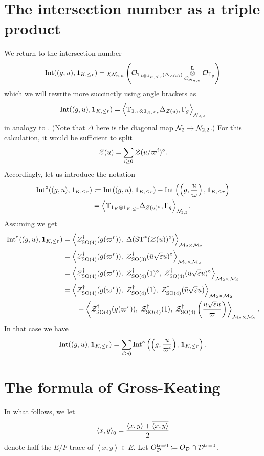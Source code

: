 \section{The intersection number as a triple product}
We return to the intersection number
\[ \operatorname{Int}((g,u), \mathbf{1}_{K, \le r}) = \chi_{\mathcal N_{n,n}} \left(
      \mathcal{O}_{\mathbb T_{\mathbf{1} \otimes \mathbf{1}_{K, \le r}}(\Delta_{\mathcal Z(u)})}
      \mathop{\otimes}^{\mathbf{L}}_{\mathcal{O}_{\mathcal N_{n,n}}} \mathcal{O}_{\Gamma_g} \right) \]
which we will rewrite more succinctly using angle brackets as
\[ \operatorname{Int}((g,u), \mathbf{1}_{K, \le r}) = \Big\langle
  \mathbb{T}_{\mathbf{1}_K \otimes \mathbf{1}_{K, \le r}}
  \Delta_{\mathcal Z(u)}, \Gamma_g \Big\rangle_{\mathcal N_{2,2}} \]
in analogy to \cite[\S6.1]{ref:AFLspherical}.
(Note that $\Delta$ here is the diagonal map $\mathcal N_2 \to \mathcal N_{2,2}$.)
For this calculation, it would be sufficient to split
\[ \mathcal Z(u) = \sum_{i \ge 0} \mathcal Z(u/\varpi^i)^\circ. \]
Accordingly, let us introduce the notation
\begin{align*}
  \operatorname{Int}^\circ((g,u), \mathbf{1}_{K, \le r})
  &\coloneqq \operatorname{Int}((g,u), \mathbf{1}_{K, \le r}) - \operatorname{Int}\left( \left( g, \frac{u}{\varpi} \right), \mathbf{1}_{K, \le r} \right) \\
  &= \Big\langle \mathbb{T}_{\mathbf{1}_K \otimes \mathbf{1}_{K, \le r}}
    \Delta_{\mathcal Z(u)^\circ}, \Gamma_g \Big\rangle_{\mathcal N_{2,2}}.
\end{align*}
Assuming  we get
\begin{align*}
  \operatorname{Int}^\circ((g,u), \mathbf{1}_{K, \le r})
  &= \left< \mathcal Z^{\dagger}_{\operatorname{SO}(4)}(g(\varpi^r)), \; \Delta(\operatorname{ST}^\ast(\mathcal Z(u))^\circ) \right>_{\mathcal M_2 \times \mathcal M_2} \\
  &= \left< \mathcal Z^{\dagger}_{\operatorname{SO}(4)}(g(\varpi^r)), \; \mathcal Z^{\dagger}_{\operatorname{SO}(3)}(\bar u \sqrt{\varepsilon} u)^\circ \right>_{\mathcal M_2 \times \mathcal M_2} \\
  &= \left< \mathcal Z^{\dagger}_{\operatorname{SO}(4)}(g(\varpi^r)), \; \mathcal Z^{\dagger}_{\operatorname{SO}(4)}(1)^\circ, \; \mathcal Z^{\dagger}_{\operatorname{SO}(4)}(\bar u \sqrt{\varepsilon} u)^\circ \right>_{\mathcal M_2 \times \mathcal M_2} \\
  &= \left< \mathcal Z^{\dagger}_{\operatorname{SO}(4)}(g(\varpi^r)), \; \mathcal Z^{\dagger}_{\operatorname{SO}(4)}(1), \; \mathcal Z^{\dagger}_{\operatorname{SO}(4)}(\bar u \sqrt{\varepsilon} u) \right>_{\mathcal M_2 \times \mathcal M_2} \\
  &\qquad- \left< \mathcal Z^{\dagger}_{\operatorname{SO}(4)}(g(\varpi^r)), \; \mathcal Z^{\dagger}_{\operatorname{SO}(4)}(1), \; \mathcal Z^{\dagger}_{\operatorname{SO}(4)}\left( \frac{\bar u \sqrt{\varepsilon} u}{\varpi} \right) \right>_{\mathcal M_2 \times \mathcal M_2}.
\end{align*}
In that case we have
\begin{equation}
  \operatorname{Int}((g,u), \mathbf{1}_{K, \le r})
  = \sum_{i \ge 0} \operatorname{Int}^\circ\left( \left( g, \frac{u}{\varpi^i} \right), \mathbf{1}_{K, \le r} \right).
  \label{eq:int_to_int_circ}
\end{equation}

\section{The formula of Gross-Keating}
\label{sec:GK}
In what follows, we let
\[ \left\langle x, y \right\rangle _0
  = \frac{\left\langle x,y \right\rangle + \overline{\left\langle x,y \right\rangle}}{2} \]
denote half the $E/F$-trace of $\left\langle x,y \right\rangle \in E$.
Let $O_\mathcal D^{\operatorname{tr} = 0} \coloneqq O_\mathcal D \cap \mathcal D^{\operatorname{tr} = 0}$.

